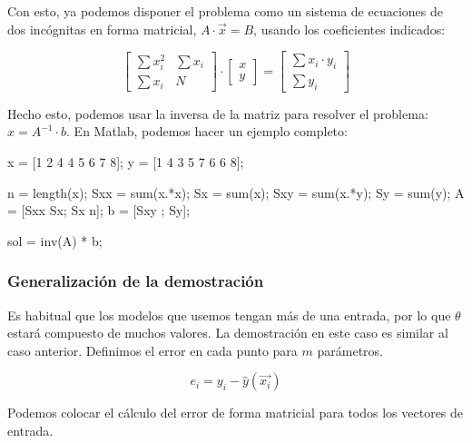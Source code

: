 \documentclass[11pt]{scrartcl}
\begin{document}
Con esto, ya podemos disponer el problema como un sistema de ecuaciones de dos
incógnitas en forma matricial, $A \cdot \vec{x} = B$, usando los coeficientes
indicados:

$$
\begin{bmatrix}
\sum x_i^2 & \sum x_i \\
\sum x_i   & N 
\end{bmatrix}
\cdot
\begin{bmatrix}
x \\ y
\end{bmatrix}
=
\begin{bmatrix}
\sum x_i \cdot y_i \\
\sum y_i  
\end{bmatrix}
$$

Hecho esto, podemos usar la inversa de la matriz para resolver el problema: $x =
A^{-1} \cdot b$. En Matlab, podemos hacer un ejemplo completo:

\begin{matlabcode}
x = [1 2 4 4 5 6 7 8];
y = [1 4 3 5 7 6 6 8];

n = length(x);
Sxx = sum(x.*x); Sx = sum(x);
Sxy = sum(x.*y); Sy = sum(y);
A = [Sxx Sx; Sx n]; b = [Sxy ; Sy];

sol = inv(A) * b;
\end{matlabcode}

\subsubsection{Generalización de la demostración}

Es habitual que los modelos que usemos tengan más de una entrada, por lo que
$\theta$ estará compuesto de muchos valores. La demostración en este caso es
similar al caso anterior. Definimos el error en cada punto para $m$ parámetros.

$$
e_i = y_i - \hat{y}(\vec{x_i})
$$

Podemos colocar el cálculo del error de forma matricial para todos los
vectores de entrada. 
\end{document}

